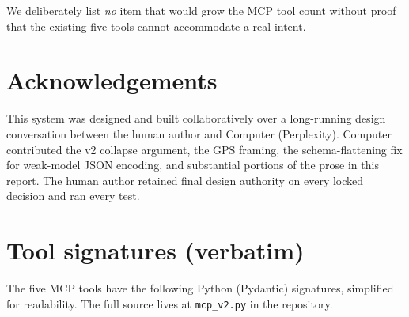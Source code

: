 \documentclass[11pt,a4paper]{article}
\begin{document}
We deliberately list \emph{no} item that would grow the MCP tool count without proof that the existing five tools cannot accommodate a real intent.

\section*{Acknowledgements}
This system was designed and built collaboratively over a long-running design conversation between the human author and Computer (Perplexity). Computer contributed the v2 collapse argument, the GPS framing, the schema-flattening fix for weak-model JSON encoding, and substantial portions of the prose in this report. The human author retained final design authority on every locked decision and ran every test.




\appendix
\section{Tool signatures (verbatim)}
\label{app:tools}

The five MCP tools have the following Python (Pydantic) signatures, simplified for readability. The full source lives at \texttt{mcp\_v2.py} in the repository.
\end{document}
